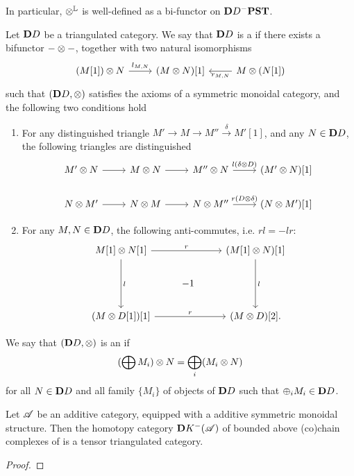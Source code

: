 In particular, $\otimes^{\mathbb{L}}$ is well-defined as a bi-functor on 
$\mathbf{D}{D}^-\mathbf{PST}$.

\begin{defn}
Let $\mathbf{D}{D}$ be a triangulated category. We say that $\mathbf{D}{D}$ 
is a  if there exists a bifunctor
$- \otimes -$, together with two natural isomorphisms 
\[
\begin{tikzcd}
(M[1]) \tensor N \arrow{r}{l_{M, N}}&
(M \tensor N)[1] &
M \tensor (N[1]) \arrow{l}{r_{M, N}}
\end{tikzcd}
\]
such that $(\mathbf{D}{D}, \otimes)$ satisfies the axioms of a 
symmetric monoidal category, and the following two conditions
hold
\begin{enumerate}
\item For any distinguished triangle $M' \to M \to M'' 
\stackrel{\delta}{\to} M'[1]$, and any $N \in \mathbf{D}{D}$,
the following triangles are distinguished
\[
\begin{tikzcd}
M' \tensor N \arrow{r} &
M \tensor N \arrow{r} &
M'' \tensor N \arrow{r}{l(\delta \tensor D)}&
(M' \tensor N)[1] \\
N \tensor M' \arrow{r} &
N \tensor M \arrow{r} &
N \tensor M'' \arrow{r}{r(D \tensor \delta)}&
(N \tensor M')[1]
\end{tikzcd}
\]

\item For any $M, N \in \mathbf{D}{D}$, the following anti-commutes,
i.e. $rl = -lr$:
\[
\begin{tikzcd}
M[1] \tensor N[1] \arrow{rr}{r}\arrow{dd}{l} && 
(M[1] \tensor N)[1] \arrow{dd}{l} \\
& -1 \\
(M \tensor D[1])[1] \arrow{rr}{r} &&
(M \tensor D)[2].
\end{tikzcd}
\]
\end{enumerate}

We say that $(\mathbf{D}{D}, \otimes)$ is an  if 
\[
(\bigoplus M_i) \otimes N = \bigoplus_i (M_i \otimes N)
\]
for all $N \in \mathbf{D}{D}$ and all family $\{M_i\}$ of
objects of $\mathbf{D}{D}$ such that $\oplus_i M_i \in \mathbf{D}{D}$.
\end{defn}

\begin{lem}\label{lem_tensor_add_cat}
Let $\mathscr{A}$ be an additive category, equipped with a additive 
symmetric monoidal structure. Then the homotopy category 
$\mathbf{D}{K}^-(\mathscr{A})$ of bounded above (co)chain complexes of
is a tensor triangulated category.
\end{lem}
\begin{proof}
\end{proof}

